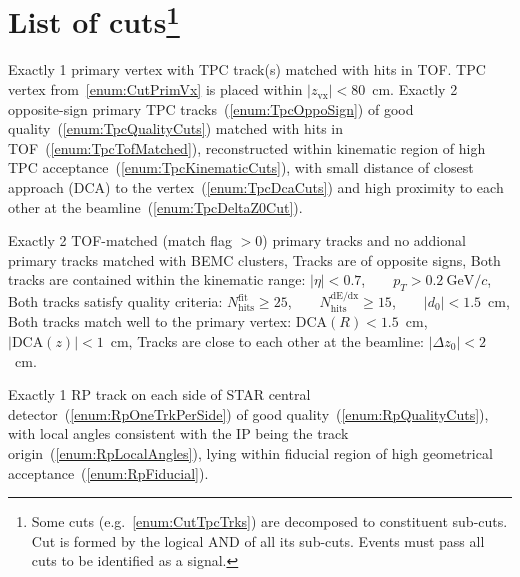 \section[List of cuts]{List of cuts\footnote{Some cuts (e.g.~\ref{enum:CutTpcTrks}) are decomposed to constituent sub-cuts. Cut is formed by the logical AND of all its sub-cuts. Events must pass all cuts to be identified as a signal.}}\label{sec:listOfCuts}
\begin{enumerate}[label=\textbf{C\arabic*},ref=C\arabic*]
 \itemm Exactly 1 primary vertex with TPC track(s) matched with hits in TOF.\label{enum:CutPrimVx}
 \itemm TPC vertex from~\ref{enum:CutPrimVx} is placed within $|z_{\text{vx}}|<80$~cm.\label{enum:CutZVx}
 \itemm Exactly 2 opposite-sign primary TPC tracks~(\ref{enum:TpcOppoSign}) of good quality~(\ref{enum:TpcQualityCuts}) matched with hits in TOF~(\ref{enum:TpcTofMatched}), reconstructed within kinematic region of high TPC acceptance~(\ref{enum:TpcKinematicCuts}), with small distance of closest approach (DCA) to the vertex~(\ref{enum:TpcDcaCuts}) and high proximity to each other at the beamline~(\ref{enum:TpcDeltaZ0Cut}).\label{enum:CutTpcTrks}
    \begin{enumerate}[label=\textbf{\theenumi.\arabic*},ref=\theenumi.\arabic*]
      \itemm Exactly 2 TOF-matched (match flag $>0$) primary tracks and no addional primary tracks matched with BEMC clusters,\label{enum:TpcTofMatched}
      \itemm Tracks are of opposite signs,\label{enum:TpcOppoSign}
      \itemm Both tracks are contained within the kinematic range:\label{enum:TpcKinematicCuts}\hspace*{13pt}
      $|\eta|<0.7$,~~~~$p_{T}>0.2~\text{GeV}/c$,
      \itemm Both tracks satisfy quality criteria:\label{enum:TpcQualityCuts}\hspace*{100pt}
      $N_{\text{hits}}^{\text{fit}}\geq25$,~~~~$N_{\text{hits}}^{\text{dE/dx}}\geq15$,~~~~$|d_{0}|<1.5$~cm,
      \itemm Both tracks match well to the primary vertex:\label{enum:TpcDcaCuts}\hspace*{47pt}
      $\text{DCA}(R)<1.5$~cm,~~~~$|\text{DCA}(z)|<1$~cm,
      \itemm Tracks are close to each other at the beamline:\label{enum:TpcDeltaZ0Cut}\hspace*{45pt}
      $|\Delta z_{0}|<2$~cm.
    \end{enumerate}
 \itemm Exactly 1 RP track on each side of STAR central detector~(\ref{enum:RpOneTrkPerSide}) of good quality~(\ref{enum:RpQualityCuts}), with local angles consistent with the IP being the track origin~(\ref{enum:RpLocalAngles}), lying within fiducial region of high geometrical acceptance~(\ref{enum:RpFiducial}).\label{enum:CutRpTrks}

\end{enumerate}
